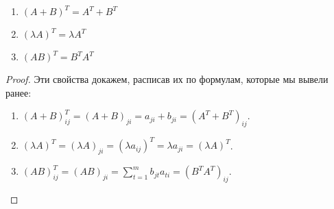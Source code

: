 \begin{theorem}
    \begin{enumerate}[nolistsep]
        \item $(A + B)^T = A^T + B^T$
        \item $(\lambda A)^T = \lambda A^T$
        \item $(AB)^T = B^TA^T$
    \end{enumerate}
\end{theorem}

\begin{proof}
    Эти свойства докажем, расписав их по формулам, которые мы вывели ранее:
    \begin{enumerate}
        \item $\displaystyle (A + B)^T_{ij} =  (A + B)_{ji} = a_{ji} + b_{ji} = (A^T + B^T)_{ij}$.
        \item $\displaystyle (\lambda A)^T = (\lambda A)_{ji} = (\lambda a_{ij})^T = \lambda a_{ji} = (\lambda A)^T$.
        \item $\displaystyle (AB)^T_{ij} = (AB)_{ji} = \sum_{t = 1}^m b_{jt}a_{ti} = (B^TA^T)_{ij}$.
    \end{enumerate}
\end{proof}


